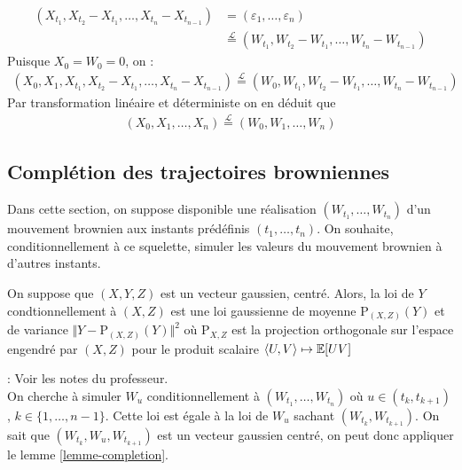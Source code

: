 \begin{equation*}
\begin{split}
  (X_{t_1}, X_{t_2} - X_{t_1}, \ldots, X_{t_n} - X_{t_{n-1}}) &= (\varepsilon_1, \ldots, \varepsilon_n) \\
  &\overset{\mathcal{L}}{=} (W_{t_1}, W_{t_2} - W_{t_1}, \ldots, W_{t_n} - W_{t_{n-1}})
\end{split}
\end{equation*}
Puisque $X_0 = W_0 = 0$, on :
\begin{equation*}
\begin{split}
  (X_0, X_1, X_{t_1}, X_{t_2} - X_{t_1}, \ldots, X_{t_n} - X_{t_{n-1}}) \overset{\mathcal{L}}{=} (W_0, W_{t_1}, W_{t_2} - W_{t_1}, \ldots, W_{t_n} - W_{t_{n-1}})
\end{split}
\end{equation*}
Par transformation linéaire et déterministe on en déduit que 
\begin{equation*}
\begin{split}
  (X_0, X_1, \ldots, X_n) \overset{\mathcal{L}}{=} (W_0, W_1, \ldots, W_n)
\end{split}
\end{equation*}

\subsection{Complétion des trajectoires browniennes}

\renewcommand{\P}{\mathrm{P}}

Dans cette section, on suppose disponible une réalisation $(W_{t_1},\ldots,W_{t_n})$ d'un mouvement brownien aux instants prédéfinis $(t_1,\ldots,t_n)$. 
On souhaite, conditionnellement à ce squelette, simuler les valeurs du mouvement brownien à d'autres instants.

\begin{lem}
  \label{lemme-completion}
  On suppose que $(X,Y,Z)$ est un vecteur gaussien, centré. Alors, la loi de $Y$ condtionnellement à $(X,Z)$ est une loi gaussienne de moyenne $\P_{(X,Z)}(Y)$ et de variance $\Vert Y - \P_{(X,Z)}(Y) \Vert^2$ où $\P_{X,Z}$ est la projection orthogonale sur l'espace engendré par $(X,Z)$ pour le produit scalaire $ \langle U, V \rangle \mapsto \mathbb{E}[UV]$
\end{lem}

\Preuve : Voir les notes du professeur. \\

On cherche à simuler $W_u$ conditionnellement à $(W_{t_1},\ldots,W_{t_n})$ où $u \in (t_{k},t_{k + 1})$, $k \in \{1, \ldots, n-1 \}$. Cette loi est égale à la loi de $W_u$ sachant $(W_{t_k}, W_{t_{k+1}})$. On sait que $(W_{t_k}, W_u, W_{t_{k+1}})$ est un vecteur gaussien centré, on peut donc appliquer le lemme \ref{lemme-completion}. \\

